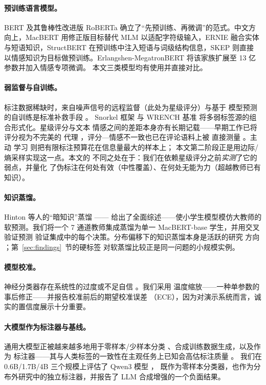 \documentclass[11pt,a4paper]{article}
\begin{document}
\paragraph{预训练语言模型。}
BERT \citep{devlin2019} 及其鲁棒性改进版 RoBERTa \citep{liu2019}
确立了“先预训练、再微调”的范式。中文方向上，MacBERT
\citep{cui2020} 用修正版目标替代 MLM 以适配字符级输入，ERNIE
\citep{sun2019} 融合实体与短语知识，StructBERT \citep{wang2020}
在预训练中注入短语与词级结构信息，SKEP \citep{tian2020} 则直接
以情感知识为目标做预训练。Erlangshen-MegatronBERT
\citep{idea2023} 将该家族扩展至 13 亿参数并加入情感专项微调。
本文三类模型均有使用并直接对比。

\paragraph{弱监督与自训练。}
标注数据稀缺时，来自噪声信号的远程监督（此处为星级评分）与基于
模型预测的自训练是标准补救手段 \citep{yarowsky1995,lee2013}。
Snorkel 框架 \citep{ratner2017} 与 WRENCH 基准
\citep{zhang2021wrench} 将多弱标签源的组合形式化。星级评分与文本
情感之间的差距本身亦有长期记载——早期工作已将评分视为不完美的
代理 \citep{pang2005seeing}，评分—情感不一致也已在评论语料上被
直接测量 \citep{abaiyan2026stars}。主动
学习 \citep{settles2009} 则把有限标注预算花在信息量最大的样本上；
本文第二阶段正是用边际/熵采样实现这一点。本文的
不同之处在于：我们在依赖星级评分之前\emph{实测}了它的弱点，并量化
了伪标注在何处有效（中性覆盖）、在何处无能为力（超越教师已有知识）。

\paragraph{知识蒸馏。}
Hinton 等人的“暗知识”蒸馏 \citep{hinton2015}——\citet{gou2021}
给出了全面综述——使小学生模型模仿大教师的软预测。我们将一个
7 通道教师集成蒸馏为单一 MacBERT-base 学生，并用交叉验证预测
验证集成中的每个决策。分布偏移下的知识蒸馏本身是活跃的研究
方向 \citep{zhang2023shiftkd}；第~\ref{sec:findings}~节的硬标签
对软蒸馏比较正是同一问题的小规模实例。

\paragraph{模型校准。}
神经分类器存在系统性的过度或不足自信 \citep{guo2017}。我们采用
温度缩放——一种单参数的事后修正——并报告校准前后的期望校准误差
（ECE），因为对演示系统而言，诚实的置信度展示十分重要。

\paragraph{大模型作为标注器与基线。}
通用大模型正被越来越多地用于零样本/少样本分类
\citep{gilardi2023,tornberg2023}、合成训练数据生成，以及作为
标注器——其与人类标签的一致性在主观任务上已知会高估标注质量
\citep{moller2024parrot,schroeder2025}。
我们在 0.6B/1.7B/4B 三个规模上评估了 Qwen3 模型 \citep{qwen2025}，
既作为零样本分类器，也作为分布外研究中的独立标注器，并报告了
LLM 合成增强的一个负面结果。
\end{document}
